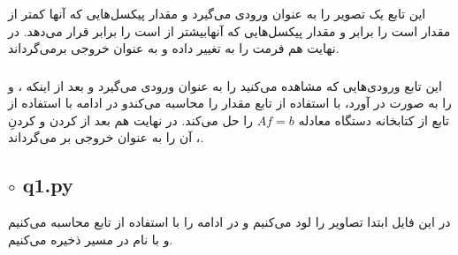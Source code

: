 \documentclass[a4paper,12pt]{article}
\begin{document}
	 \subsubsection*{}
	 این تابع یک تصویر را به عنوان ورودی می‌گیرد و مقدار 
	   پیکسل‌هایی که 
	   آنها کمتر از مقدار 
	    است را برابر و مقدار 
	    پیکسل‌هایی که 
	    آنهابیشتر از
	    است را برابر 
	    قرار می‌دهد. در نهایت هم فرمت را به 
	     تغییر داده و به عنوان خروجی برمی‌گرداند.
	\subsubsection*{}
	این تابع ورودی‌هایی که مشاهده می‌کنید را به عنوان ورودی می‌گیرد و بعد از اینکه 
	،
	و
	را به صورت 
	در آورد، با استفاده از تابع 
	مقدار 
	را محاسبه می‌کندو در ادامه با استفاده از تابع 
	از کتابخانه 
	دستگاه معادله $ Af = b $ را حل می‌کند. در نهایت هم بعد از 
	کردن و 
	کردنِ 
	،
	آن را به عنوان خروجی بر می‌گرداند.
	\subsection*{$\circ$ q1.py}
	در این فایل ابتدا تصاویر را لود می‌کنیم و در ادامه 
	را با استفاده از تابع 
	محاسبه می‌کنیم و با نام 
	در مسیر 
	ذخیره می‌کنیم.
\end{document}
